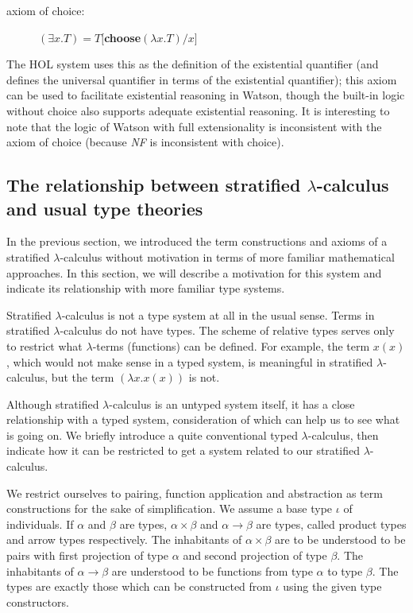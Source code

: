 \documentclass{kluwer}
\begin{document}
\begin{article}
\begin{description} 

\item[axiom of choice:]  $(\exists x.T) = T[${\bf choose}$(\lambda x.T)/x]$

\end{description}

The HOL system uses this as the definition of the existential
quantifier (and defines the universal quantifier in terms of the
existential quantifier); this axiom can be used to facilitate
existential reasoning in Watson, though the built-in logic without
choice also supports adequate existential reasoning.  It is
interesting to note that the logic of Watson with full extensionality
is inconsistent with the axiom of choice (because {\em NF\/} is
inconsistent with choice).

\subsection 
{The relationship between stratified $\lambda$-calculus and usual type
theories}

In the previous section, we introduced the term constructions and axioms
of a stratified $\lambda$-calculus without motivation in terms of more
familiar mathematical approaches.  In this section, we will describe 
a motivation for this system and indicate its relationship with more
familiar type systems.

Stratified $\lambda$-calculus is not a type system at all in the usual
sense.  Terms in stratified $\lambda$-calculus do not have types.  The
scheme of relative types serves only to restrict what $\lambda$-terms
(functions) can be defined.  For example, the term $x(x)$, which would
not make sense in a typed system, is meaningful in stratified
$\lambda$-calculus, but the term $(\lambda x.x(x))$ is not.

Although stratified $\lambda$-calculus is an untyped system itself, it has
a close relationship with a typed system, consideration of which can help
us to see what is going on.  We briefly introduce a quite conventional
typed $\lambda$-calculus, then indicate how it can be restricted to get
a system related to our stratified $\lambda$-calculus.

We restrict ourselves to pairing, function application and abstraction
as term constructions for the sake of simplification.  We assume a
base type $\iota$ of individuals.  If $\alpha$ and $\beta$ are
types, $\alpha \times \beta$ and $\alpha \rightarrow \beta$ are types,
called product types and arrow types respectively.  The inhabitants of
$\alpha \times \beta$ are to be understood to be pairs with first
projection of type $\alpha$ and second projection of type $\beta$.
The inhabitants of $\alpha \rightarrow \beta$ are understood to be
functions from type $\alpha$ to type $\beta$.  The types are exactly
those which can be constructed from $\iota$ using the given type
constructors.


\end{article}
\end{document}
